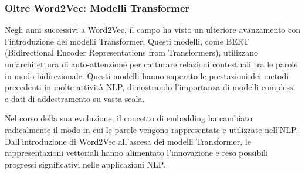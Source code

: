 \subsubsection{Oltre Word2Vec: Modelli Transformer}
Negli anni successivi a Word2Vec, il campo ha visto un ulteriore avanzamento con l'introduzione dei modelli Transformer. Questi modelli, come BERT (Bidirectional Encoder Representations from Transformers), utilizzano un'architettura di auto-attenzione per catturare relazioni contestuali tra le parole in modo bidirezionale. Questi modelli hanno superato le prestazioni dei metodi precedenti in molte attività NLP, dimostrando l'importanza di modelli complessi e dati di addestramento su vasta scala.

Nel corso della sua evoluzione, il concetto di embedding ha cambiato radicalmente il modo in cui le parole vengono rappresentate e utilizzate nell'NLP. Dall'introduzione di Word2Vec all'ascesa dei modelli Transformer, le rappresentazioni vettoriali hanno alimentato l'innovazione e reso possibili progressi significativi nelle applicazioni NLP.